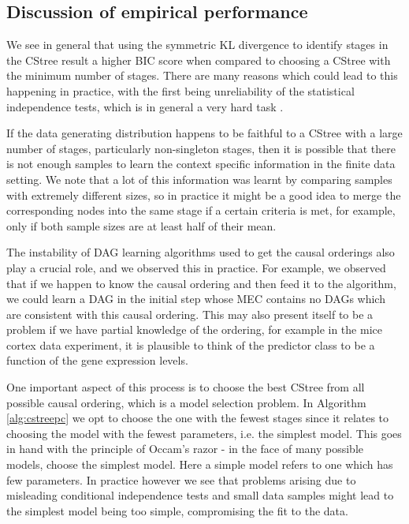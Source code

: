 \documentclass{tufte-book}
\begin{document}
\begin{Definition}
\section{Discussion of empirical performance}
\label{sec:orgce73e20}

We see in general that using the symmetric KL divergence to identify stages in the CStree result a higher BIC score when compared to choosing a CStree with the minimum number of stages. There are many reasons which could lead to this happening in practice, with the first being unreliability of the statistical independence tests, which is in general a very hard task \cite{shah-2020-hardn-condit}.


If the data generating distribution happens to be faithful to a CStree with a large number of stages, particularly non-singleton stages, then it is possible that there is not enough samples to learn the context specific information in the finite data setting. We note that a lot of this information was learnt by comparing samples with extremely different sizes, so in practice it might be a good idea to merge the corresponding nodes into the same stage if a certain criteria is met, for example, only if both sample sizes are at least half of their mean.


The instability of DAG learning algorithms used to get the causal orderings also play a crucial role, and we observed this in practice. For example, we observed that if we happen to know the causal ordering and then feed it to the algorithm, we could learn a DAG in the initial step whose MEC contains no DAGs which are consistent with this causal ordering.  This may also present itself to be a problem if we have partial knowledge of the ordering, for example in the mice cortex data experiment, it is plausible to think of the predictor class to be a function of the gene expression levels.


One important aspect of this process is to choose the best CStree from all possible causal ordering, which is a model selection problem. In Algorithm \ref{alg:cstreepc} we opt to choose the one with the fewest stages since it relates to choosing the model with the fewest parameters, i.e. the simplest model. This goes in hand with the principle of Occam's razor - in the face of many possible models, choose the simplest model. Here a simple model refers to one which has few parameters. In practice however we see that problems arising due to misleading conditional independence tests and small data samples might lead to the simplest model being too simple, compromising the fit to the data.



\end{Definition}
\end{document}
